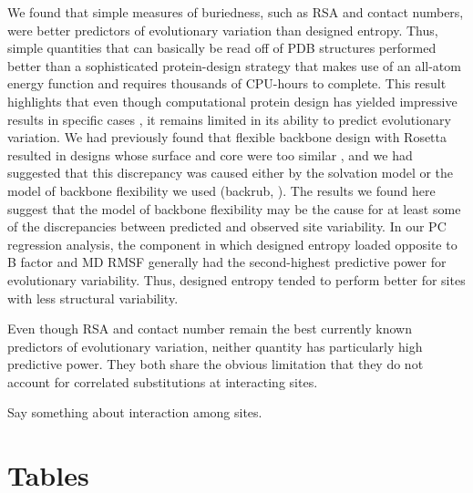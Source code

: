 \documentclass[12pt]{article}
\begin{document}
We found that simple measures of buriedness, such as RSA and contact numbers, were better predictors of evolutionary variation than designed entropy. Thus, simple quantities that can basically be read off of PDB structures performed better than a sophisticated protein-design strategy that makes use of an all-atom energy function and requires thousands of CPU-hours to complete. This result highlights that even though computational protein design has yielded impressive results in specific cases \citep{Kuhlman2003,Rothlisberger2008,Fleishman2011}, it remains limited in its ability to predict evolutionary variation. We had previously found that flexible backbone design with Rosetta resulted in designs whose surface and core were too similar \citep{Jacksonetal2013}, and we had suggested that this discrepancy was caused either by the solvation model or the model of backbone flexibility we used (backrub, \citealt{Smith2008}). The results we found here suggest that the model of backbone flexibility may be the cause for at least some of the discrepancies between predicted and observed site variability. In our PC regression analysis, the component in which designed entropy loaded opposite to B factor and MD RMSF generally had the second-highest predictive power for evolutionary variability. Thus, designed entropy tended to perform better for sites with less structural variability.

Even though RSA and contact number remain the best currently known predictors of evolutionary variation, neither quantity has particularly high predictive power. They both share the obvious limitation that they do not account for correlated substitutions at interacting sites. 

{\color{blue}Say something about interaction among sites. \citep{Halabietal2009,BurgervanNimwegen2010,Marksetal2011,Jonesetal2014}
\citep{Rodrigueetal2005,BordnerMittelmann2014}
}


\newpage

\section*{Tables}
\end{document}
